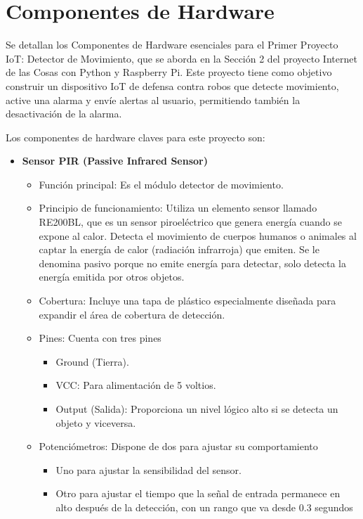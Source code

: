 \documentclass{report}
\begin{document}
\section{Componentes de Hardware}
Se detallan los Componentes de Hardware esenciales para el Primer Proyecto IoT: Detector de Movimiento, que se aborda en la Sección 2 del proyecto 
Internet de las Cosas con Python y Raspberry Pi. Este proyecto tiene como objetivo construir un dispositivo IoT de defensa contra robos que detecte movimiento, 
active una alarma y envíe alertas al usuario, permitiendo también la desactivación de la alarma.

Los componentes de hardware claves para este proyecto son:
\begin{itemize}
    \item \textbf{Sensor PIR (Passive Infrared Sensor)}
    \begin{itemize}
        \item Función principal: Es el módulo detector de movimiento.
        \item Principio de funcionamiento: Utiliza un elemento sensor llamado RE200BL, que es un sensor piroeléctrico que genera energía cuando se 
        expone al calor. Detecta el movimiento de cuerpos humanos o animales al captar la energía de calor (radiación infrarroja) que emiten. Se le 
        denomina pasivo porque no emite energía para detectar, solo detecta la energía emitida por otros objetos.
        \item Cobertura: Incluye una tapa de plástico especialmente diseñada para expandir el área de cobertura de detección.
        \item Pines: Cuenta con tres pines
        \begin{itemize}
            \item Ground (Tierra).
            \item VCC: Para alimentación de 5 voltios.
            \item Output (Salida): Proporciona un nivel lógico alto si se detecta un objeto y viceversa.
        \end{itemize}
        \item Potenciómetros: Dispone de dos para ajustar su comportamiento
        \begin{itemize}
            \item Uno para ajustar la sensibilidad del sensor.
            \item Otro para ajustar el tiempo que la señal de entrada permanece en alto después de la detección, con un rango que va desde 0.3 segundos 

\end{itemize}
\end{itemize}
\end{itemize}
\end{document}
